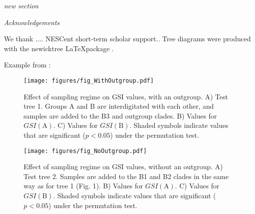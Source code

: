 \documentclass[12pt,letterpaper]{article}
\renewcommand{\section}[1]{
\bigskip
\noindent
\begin{Large}
\textit{\textsf{#1}}
\medskip
\end{Large}
}
\newcommand{\gsi}[1]{\ensuremath{GSI(\text{#1})}}
\begin{document}
\section{new section}

\section{Acknowledgements}

We thank .... NESCent short-term scholar support.. Tree diagrams were
produced with the \textsf{newicktree} \LaTeX package \citep{Savva:2004}.




\newpage
Example from \citet{Savva:2004}:
\begin{newicktree}
\end{newicktree}



\pagebreak





\pagebreak

\begin{figure} %
\texttt{[image: figures/fig\_WithOutgroup.pdf]}
\caption{Effect of sampling regime on GSI values, with an outgroup. A)
Test tree 1. Groups A and B are interdigitated with each other, and
samples are added to the B3 and outgroup clades. B) Values for \gsi{A}.
C) Values for \gsi{B}. Shaded symbols indicate values that are
significant ($p<0.05$) under the permutation test.}
\label{fig:w_outgroup}
\end{figure}

\begin{figure} %
\texttt{[image: figures/fig\_NoOutgroup.pdf]}
\caption{Effect of sampling regime on GSI values, without an outgroup.
A) Test tree 2. Samples are added to the B1 and B2 clades in the same
way as for tree 1 (Fig. 1). B) Values for \gsi{A}. C) Values for \gsi{B}.
Shaded symbols indicate values that are significant ($p<0.05$)
under the permutation test.}
\label{fig:no_outgroup}
\end{figure}
\end{document}
